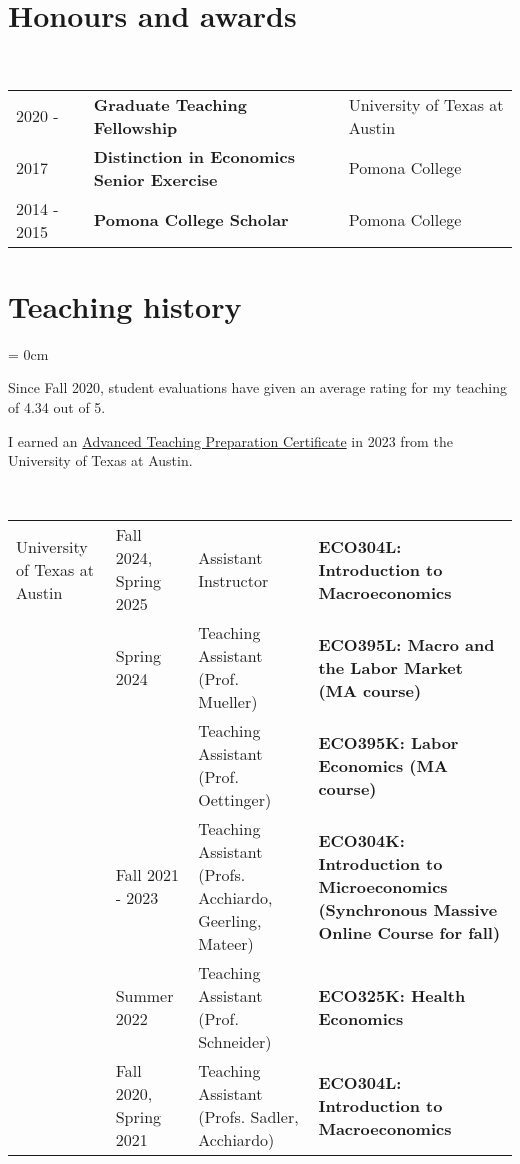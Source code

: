 \documentclass[a4paper, 10pt]{article}
\begin{document}
  \section{Honours and awards}
  ~\begin{tabular}{lll}
    2020 - & \textbf{Graduate Teaching Fellowship} & University of Texas at Austin\\
    2017 & \textbf{Distinction in Economics Senior Exercise} & Pomona College\\
    2014 - 2015 & \textbf{Pomona College Scholar} & Pomona College
  \end{tabular}
  \vspace*{0.25em}

  \section{Teaching history}\label{sec:teaching_history}
  \begin{compactitem}\parskip = 0cm
    \item Since Fall 2020, student evaluations have given an average rating for my teaching of 4.34 out of 5.
    \item I earned an \href{https://ctl.utexas.edu/teaching-preparation-series}{Advanced Teaching Preparation Certificate} in 2023 from the University of Texas at Austin.
  \end{compactitem}
  \vspace*{0.70em}
  ~\begin{tabular}{p{2.3cm} p{2.4cm} p{2.8cm} p{6.6cm}}
    University of \newline Texas at Austin & Fall 2024, \newline Spring 2025 & Assistant Instructor & \textbf{ECO304L: Introduction to \newline Macroeconomics}\\
    & Spring 2024 & Teaching Assistant \newline (Prof. Mueller) & \textbf{ECO395L: Macro and the Labor Market \newline (MA course)}\\
    & & Teaching Assistant \newline (Prof. Oettinger) & \textbf{ECO395K: Labor Economics (MA course)}\\
    & Fall 2021 - 2023 & Teaching Assistant \newline (Profs. Acchiardo, \newline Geerling, Mateer) & \textbf{ECO304K: Introduction to Microeconomics \newline (Synchronous Massive Online Course for \newline fall)}\\
    & Summer 2022 & Teaching Assistant \newline (Prof. Schneider) & \textbf{ECO325K: Health Economics}\\
    & Fall 2020, \newline Spring 2021 & Teaching Assistant \newline (Profs. Sadler, \newline Acchiardo) & \textbf{ECO304L: Introduction to \newline Macroeconomics}
  \end{tabular}
\end{document}
